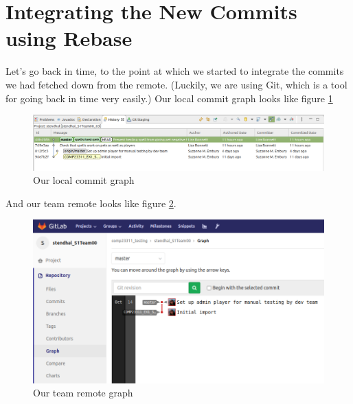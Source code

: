 \documentclass[
]{book}
\begin{document}
\hypertarget{rebase}{%
\section{Integrating the New Commits using Rebase}\label{rebase}}

Let's go back in time, to the point at which we started to integrate the commits we had fetched down from the remote. (Luckily, we are using Git, which is a tool for going back in time very easily.) Our local commit graph looks like figure \ref{fig:localCommitGraphAfterPushRejectedAndFetchNoHistorya-fig}

\begin{figure}

{\centering \includegraphics[width=1\linewidth]{images/localCommitGraphAfterPushRejectedAndFetchNoHistory} 

}

\caption{Our local commit graph}\label{fig:localCommitGraphAfterPushRejectedAndFetchNoHistorya-fig}
\end{figure}

And our team remote looks like figure \ref{fig:commitGraphInGitLabAfterPushNoHistoryGraphOnlya-fig}.

\begin{figure}

{\centering \includegraphics[width=1\linewidth]{images/commitGraphInGitLabAfterPushNoHistoryGraphOnly} 

}

\caption{Our team remote graph}\label{fig:commitGraphInGitLabAfterPushNoHistoryGraphOnlya-fig}
\end{figure}
\end{document}
